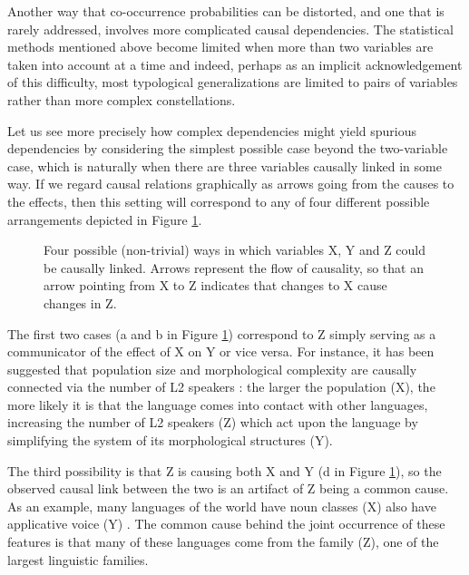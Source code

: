 \documentclass[output=paper]{langsci/langscibook}
\begin{document}
Another way that co-occurrence probabilities can be distorted, and one that is rarely addressed, involves more complicated causal dependencies.  The statistical methods mentioned above become limited when more than two variables are taken into account at a time and indeed, perhaps as an implicit acknowledgement of this difficulty, most typological generalizations are limited to pairs of variables rather than more complex constellations. 

Let us see more precisely how complex dependencies might yield spurious dependencies by considering the simplest possible case beyond the two-variable case, which is naturally when there are three variables causally linked in some way. If we regard causal relations graphically as arrows going from the causes to the effects, then this setting will correspond to any of four different possible arrangements depicted in Figure \ref{fig:vars}.


\begin{figure}

\resizebox{.6\textwidth}{!}{

}

\caption{Four possible (non-trivial) ways in which variables X, Y and Z could be causally linked.  Arrows represent the flow of causality, so that an arrow pointing from X to Z indicates that changes to X cause changes in Z.}
\label{fig:vars}
\end{figure}


  The first two cases (a and b in Figure \ref{fig:vars}) correspond to Z simply serving as a communicator of the effect of X on Y or vice versa. For instance, it has been suggested that population size and morphological complexity are causally connected via the number of L2 speakers \citep{lupyan2010language}: the larger the population (X), the more likely it is that the language comes into contact with other languages, increasing the number of L2 speakers (Z) which act upon the language by simplifying the system of its morphological structures (Y).
 
The third possibility is that Z is causing both X and Y (d in Figure \ref{fig:vars}), so the observed causal link between the two is an artifact of Z being a common cause. As an example, many languages of the world have noun classes (X) also have applicative voice (Y) \citep{aronoff2011morphology}. The common cause behind the joint occurrence of these features is that many of these languages come from the  family (Z), one of the largest linguistic families.
 
\end{document}
